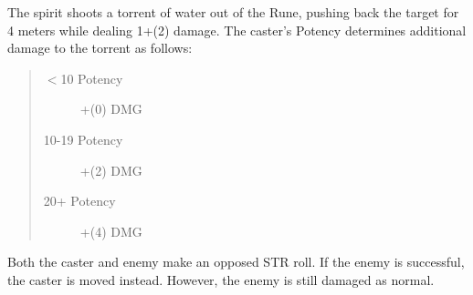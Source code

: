 \documentclass[11pt,a4paper,twocolumn]{book}
\begin{document}
\medskip

The spirit shoots a torrent of water out of the Rune, pushing back the target for 4 meters while dealing 1+(2) damage. The caster's Potency determines additional damage to the torrent as follows:

\begin{quote}
	\begin{description}
		\item[$<$10 Potency] 	+(0) DMG
		\item[10-19 Potency] 	+(2) DMG
		\item[20+ Potency] 		+(4) DMG
	\end{description}	
\end{quote}

Both the caster and enemy make an opposed STR roll. If the enemy is successful, the caster is moved instead. However, the enemy is still damaged as normal.

\vfill

%	
%
%
\end{document}
